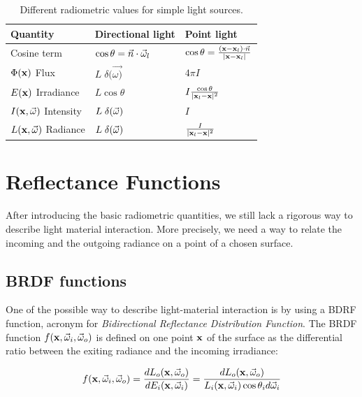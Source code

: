\renewcommand{\arraystretch}{1.8}
\begin{table}[!ht]
    \centering
    \begin{tabularx}{0.95\textwidth}{|X|X|X|}
    \hline
    Quantity   & Directional light & Point light \\ \hline
    Cosine term       & $\cos\theta = \vec{n} \cdot \vec{\omega}_l$ & $\cos\theta = \frac{(\mathbf{x} - \mathbf{x}_l) \cdot \vec{n}}{|\mathbf{x} - \mathbf{x}_l|}$     \\ \hline
    $\Phi(\mathbf{x})$ Flux       & $L\; \delta(\vec{\omega)}$                  & $4 \pi I$           \\ \hline
    $E(\mathbf{x})$ Irradiance & $L \cos\theta $                 & $I \frac{\cos\theta}{|\mathbf{x}_l - \mathbf{x}|^2}$          \\ \hline
    $I(\mathbf{x},\vec{\omega})$ Intensity  & $L\; \delta(\vec{\omega})$                 & $I$           \\ \hline
    $L(\mathbf{x},\vec{\omega})$ Radiance   & $L\; \delta(\vec{\omega})$               & $\frac{I}{|\mathbf{x}_l - \mathbf{x}|^2}$           \\ \hline
    \end{tabularx}
\caption{Different radiometric values for simple light sources.}
\label{table:radio}
\end{table}

\section{Reflectance Functions}
 
After introducing the basic radiometric quantities, we still lack a rigorous way to describe light material interaction. More precisely, we need a way to relate the incoming and the outgoing radiance on a point of a chosen surface. 

\subsection{BRDF functions}
\label{sec:brdf}
One of the possible way to describe light-material interaction is by using a BDRF function, acronym for \emph{Bidirectional Reflectance Distribution Function}. The BRDF function $f(\mathbf{x}, \vec{\omega}_i, \vec{\omega}_o)$ is defined on one point $\mathbf{x}$ of the surface as the differential ratio between the exiting radiance and the incoming irradiance:

\begin{equation}
f(\mathbf{x}, \vec{\omega}_i, \vec{\omega}_o) = \frac{d L_o(\mathbf{x}, \vec{\omega}_o)}{d E_i(\mathbf{x}, \vec{\omega}_i)} = \frac{d L_o(\mathbf{x}, \vec{\omega}_o)}{L_i(\mathbf{x}, \vec{\omega}_i) \cos\theta_i d \vec{\omega}_i}
\label{eq:brdf}
\end{equation}

